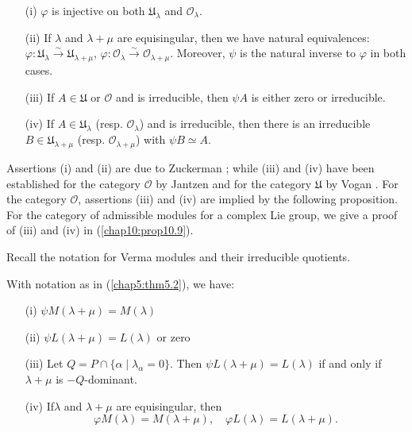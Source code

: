 \setcounter{prop}{1}
\begin{theorem}\label{chap5:thm5.2}
\begin{itemize}
\item[{\rm (i)}] $\varphi$ is injective on both $\mathfrak{U}_\lambda$ and
  $\mathscr{O}_\lambda$. 

\item[{\rm (ii)}] If $\lambda$ and $\lambda + \mu$ are equisingular, then we have
  natural equivalences: $\varphi:\mathfrak{U}_\lambda
  \xrightarrow{\sim} \mathfrak{U}_{\lambda + \mu}$, $\varphi:
  \mathscr{O}_\lambda \xrightarrow{\sim} \mathscr{O}_{\lambda +
    \mu}$. Moreover, $\psi$ is the natural inverse to $\varphi$ in
  both cases.

\item[{\rm (iii)}] If $A \in \mathfrak{U}$ or $\mathscr{O}$ and is irreducible,
  then $\psi A$ is either zero or irreducible.

\item[{\rm (iv)}]
If $A \in \mathfrak{U}_\lambda$ (resp. $\mathscr{O}_\lambda$) and
  is irreducible, then there is an irreducible $B \in
  \mathfrak{U}_{\lambda + \mu}$ (resp. $\mathscr{O}_{\lambda + \mu}$)
  with $\psi B \simeq A$.
\end{itemize}
\end{theorem}

Assertions (i) and (ii) are due to Zuckerman \cite{key38}; while (iii)
and (iv) have been established for the category $\mathscr{O}$ by
Jantzen \cite{key24} and for the category $\mathfrak{U}$ by Vogan
\cite{key34}. For the category $\mathscr{O}$, assertions (iii) and
(iv) are implied by the following proposition. For the category of
admissible modules for a complex Lie group, we give a proof of (iii)
and (iv) in (\ref{chap10:prop10.9}). 

Recall the notation for Verma modules and their irreducible
quotients. 

\begin{prop}\label{chap5:prop5.3}
With notation as in (\ref{chap5:thm5.2}), we have:
\begin{itemize}
\item[{\rm(i)}] $\psi M(\lambda + \mu) = M(\lambda)$

\item[{\rm(ii)}] $\psi L(\lambda + \mu) = L(\lambda)$ or zero

\item[{\rm(iii)}] Let $Q = P \cap \{\alpha \mid \lambda_\alpha = 0
  \}$. Then $\psi L(\lambda + \mu) = L(\lambda)$ if and only if
  $\lambda + \mu$ is $-Q$-dominant.

\item[{\rm(iv)}] If\pageoriginale $\lambda$ and $\lambda + \mu$ are
  equisingular,   then 
$$
\varphi M(\lambda) = M(\lambda + \mu), \quad \varphi L(\lambda) = L
(\lambda + \mu).
$$
\end{itemize}
\end{prop}

